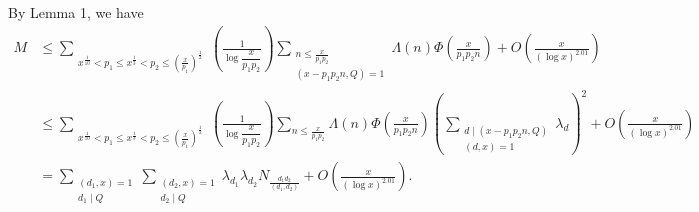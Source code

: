 By Lemma 1, we have
\begin{align*}
M&\leqslant\sum_{\substack{x^{\frac1{10}}<p_1\leqslant x^{\frac13}<p_2\leqslant(\frac{x}{p_1})^{\frac12}}}
\left(\frac{1}{\log\dfrac{x}{p_1p_2}}\right)
\sum_{\substack{n\leqslant\frac{x}{p_1p_2}\\(x-p_1p_2n,Q)=1}}
\Lambda(n)\Phi\left(\frac{x}{p_1p_2n}\right)
+O\left(\frac{x}{(\log x)^{2.01}}\right)\\
&\leqslant\sum_{\substack{x^{\frac1{10}}<p_1\leqslant x^{\frac13}<p_2\leqslant(\frac{x}{p_1})^{\frac12}}}
\left(\frac{1}{\log\dfrac{x}{p_1p_2}}\right)
\sum_{n\leqslant\frac{x}{p_1p_2}}
\Lambda(n)\Phi\left(\frac{x}{p_1p_2n}\right)
\left(\sum_{\substack{d\mid(x-p_1p_2n,Q)\\(d,x)=1}}\lambda_d\right)^2
+O\left(\frac{x}{(\log x)^{2.01}}\right)\\
&=\sum_{\substack{(d_1,x)=1\\d_1\mid Q}}
\sum_{\substack{(d_2,x)=1\\d_2\mid Q}}
\lambda_{d_1}\lambda_{d_2}
N_{\frac{d_1d_2}{(d_1,d_2)}}
+O\left(\frac{x}{(\log x)^{2.01}}\right).\tag{5}
\end{align*}

